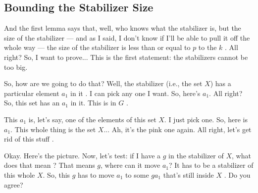 \begin{proofWrapper}
\subsection{Bounding the Stabilizer Size}

\begin{speech}[00:07:47 - 00:08:10]
And the first lemma says that, well, who knows what the stabilizer is, but the size of the stabilizer --- and as I said, I don't know if I'll be able to pull it off the whole way --- the size of the stabilizer is less than or equal to $p$ to the $k$ . All right? So, I want to prove... This is the first statement: the stabilizers cannot be too big.
\end{speech}

\begin{content}
\end{content}

\begin{speech}[00:08:10 - 00:10:04]
So, how are we going to do that? Well, the stabilizer (i.e., the set $X$) has a particular element $a_1$ in it . I can pick any one I want. So, here's $a_1$. All right? So, this set has an $a_1$ in it. This is in $G$ .

This $a_1$ is, let's say, one of the elements of this set $X$. I just pick one. So, here is $a_1$. This whole thing is the set $X$... Ah, it's the pink one again. All right, let's get rid of this stuff .

Okay. Here's the picture. Now, let's test: if I have a $g$ in the stabilizer of $X$, what does that mean ? That means $g$, where can it move $a_1$? It has to be a stabilizer of this whole $X$. So, this $g$ has to move $a_1$ to some $g a_1$ that's still inside $X$ . Do you agree?


\end{speech}
\end{proofWrapper}
